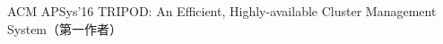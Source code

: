 \cvpub
{ACM APSys'16} %
{TRIPOD: An Efficient, Highly-available Cluster Management System（第一作者）} %
{} %
{} %
{ %
}
